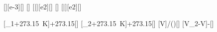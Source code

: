 [\liter][e-3][\meter\cubed]
[\degreeCelsius]
[\milli\bar][e2][\pascal]
[\degreeCelsius]
[\milli\bar][e2][\pascal]

[\vartheta_1+\SI{273.15}{\kelvin}]{\thEiX+273.15}[\kelvin]
[\vartheta_2+\SI{273.15}{\kelvin}]{\thZwX+273.15}[\kelvin]
[V\cdot{}\cdot{}]{\VFX*\pEiX*\TZwX/(\pZwX*\TEiX)}[\meter\cubed]
[V_2-V]{\VZwX-\VFX}[\meter\cubed]
